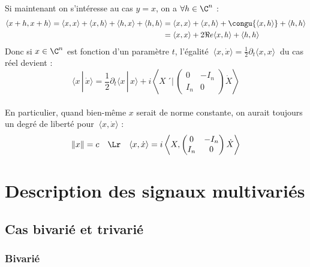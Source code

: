Si maintenant on s'intéresse au cas $y=x$, on a $\forall h\in\C^n$ :
\begin{align*}
\langle x+h, x+h \rangle = \langle x, x \rangle + \langle x, h \rangle + \langle h, x \rangle + \langle h, h \rangle 
&= \langle x, x \rangle + \langle x, h \rangle  + \congu{\langle x, h \rangle }+ \langle h, h \rangle \\
&= \langle x, x \rangle + 2\Re e \langle x, h \rangle + \langle h, h \rangle
\end{align*}
Donc si $x\in\C^n$ est fonction d'un paramètre $t$, l'égalité $\ \langle x, \dot{x} \rangle = \frac{1}{2}\partial_t\langle x, x \rangle\ $ du cas réel devient :
\begin{equation}\label{eq:x_scal_dotx}
\langle x\,|\, \dot{x} \rangle = \frac{1}{2}\partial_t\langle x\,|\, x \rangle + i\left\langle X\,´\Big|\,\begin{pmatrix} 0 & -I_n \\ I_n & 0 \end{pmatrix}\dot{X}\right\rangle
\end{equation}
\\
En particulier, quand bien-même $x$ serait de norme constante, on aurait toujours un degré de liberté pour $\ \langle x, \dot{x} \rangle$ :
\[\|x\|=c\quad \Lr\quad \langle x, \dot{x} \rangle = i\left\langle X,\begin{pmatrix} 0 & -I_n \\ I_n & 0 \end{pmatrix}\dot{X}\right\rangle\]




\section{Description des signaux multivariés}\label{sec:bases}

\subsection{Cas bivarié et trivarié}

\subsubsection{Bivarié}

